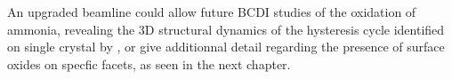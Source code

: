 An upgraded beamline could allow future BCDI studies of the oxidation of ammonia, revealing the 3D structural dynamics of the hysteresis cycle identified on single crystal by \cite{Resta2020a}, or give additionnal detail regarding the presence of surface oxides on specfic facets, as seen in the next chapter.
